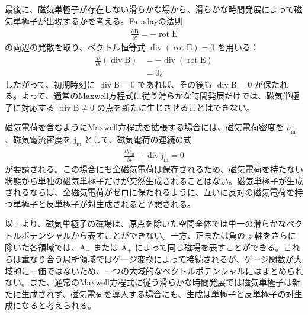 \documentclass[platex,dvipdfmx,a4paper]{jsarticle}
\newcommand{\hb}[2]{\frac{\partial #1}{\partial #2}}
\newcommand{\vect}[1]{\boldsymbol{\mathrm{#1}}}
\begin{document}
最後に、磁気単極子が存在しない滑らかな場から、滑らかな時間発展によって磁気単極子が出現するかを考える。Faradayの法則
\begin{align*}
  \hb{\vect{B}}{t}=-\operatorname{rot}\vect{E}
\end{align*}
の両辺の発散を取り、ベクトル恒等式 \(\operatorname{div}(\operatorname{rot}\vect{E})=0\) を用いる：
\begin{align*}
  \hb{}{t}(\operatorname{div}\vect{B})
  &=-\operatorname{div}(\operatorname{rot}\vect{E})\\
  &=0。
\end{align*}
したがって、初期時刻に \(\operatorname{div}\vect{B}=0\) であれば、その後も \(\operatorname{div}\vect{B}=0\) が保たれる。よって、通常のMaxwell方程式に従う滑らかな時間発展だけでは、磁気単極子に対応する \(\operatorname{div}\vect{B}\neq0\) の点を新たに生じさせることはできない。

磁気電荷を含むようにMaxwell方程式を拡張する場合には、磁気電荷密度を \(\rho_{\mathrm{m}}\)、磁気電流密度を \(\vect{j}_{\mathrm{m}}\) として、磁気電荷の連続の式
\begin{align*}
  \hb{\rho_{\mathrm{m}}}{t}
  +\operatorname{div}\vect{j}_{\mathrm{m}}=0
\end{align*}
が要請される。この場合にも全磁気電荷は保存されるため、磁気電荷を持たない状態から単独の磁気単極子だけが突然生成されることはない。磁気単極子が生成されるならば、全磁気電荷がゼロに保たれるように、互いに反対の磁気電荷を持つ単極子と反単極子が対生成されると予想される。

以上より、磁気単極子の磁場は、原点を除いた空間全体では単一の滑らかなベクトルポテンシャルから表すことができない。一方、正または負の \(z\) 軸をさらに除いた各領域では、\(\vect{A}_-\) または \(\vect{A}_+\) によって同じ磁場を表すことができる。これらは重なり合う局所領域ではゲージ変換によって接続されるが、ゲージ関数が大域的に一価ではないため、一つの大域的なベクトルポテンシャルにはまとめられない。また、通常のMaxwell方程式に従う滑らかな時間発展では磁気単極子は新たに生成されず、磁気電荷を導入する場合にも、生成は単極子と反単極子の対生成になると考えられる。
\end{document}
